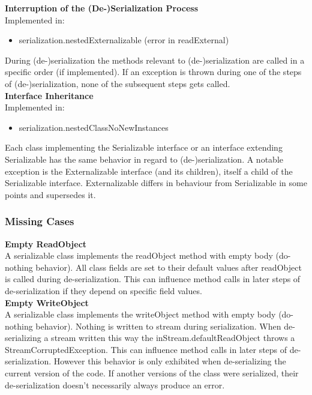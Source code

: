 \documentclass{article}
\begin{document}
\noindent
\textbf{Interruption of the (De-)Serialization Process}\\
Implemented in: 
\begin{itemize}
    \item serialization.nestedExternalizable (error in readExternal)
\end{itemize}
During (de-)serialization the methods relevant to (de-)serialization are called in a specific order (if implemented). If an exception is thrown during one of the steps of (de-)serialization, none of the subsequent steps gets called.\\

\noindent
\textbf{Interface Inheritance}\\
Implemented in: 
\begin{itemize}
    \item serialization.nestedClassNoNewInstances
\end{itemize}
Each class implementing the Serializable interface or an interface extending Serializable has the same behavior in regard to (de-)serialization. A notable exception is the Externalizable interface (and its children), itself a child of the Serializable interface. Externalizable differs in behaviour from Serializable in some points and supersedes it.\\


\subsubsection{Missing Cases}

\textbf{Empty ReadObject}\\
A serializable class implements the readObject method with empty body (do-nothing behavior). All class fields are set to their default values after readObject is called during de-serialization. This can influence method calls in later steps of de-serialization if they depend on specific field values.\\

\noindent
\textbf{Empty WriteObject}\\
A serializable class implements the writeObject method with empty body (do-nothing behavior). Nothing is written to stream during serialization. When de-serializing a stream written this way the inStream.defaultReadObject throws a StreamCorruptedException. This can influence method calls in later steps of de-serialization. However this behavior is only exhibited when de-serializing the current version of the code. If another versions of the class were serialized, their de-serialization doesn't necessarily always produce an error.\\
\end{document}
